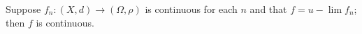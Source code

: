 Suppose $f_n: (X, d) \to (\Omega, \rho)$ is continuous for each $n$ and that $f = u - \lim f_n$; then $f$ is continuous.